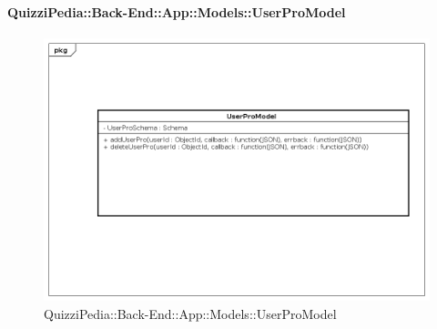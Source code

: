 \paragraph{QuizziPedia::Back-End::App::Models::UserProModel}
\label{QuizziPedia::Back-End::App::Models::UserProModel}
\begin{figure}
	\centering
	\includegraphics[scale=0.45]{UML/Package/QuizziPedia_Back-End_App_Models_userProModel.png}
	\caption{QuizziPedia::Back-End::App::Models::UserProModel}
\end{figure}
\FloatBarrier
